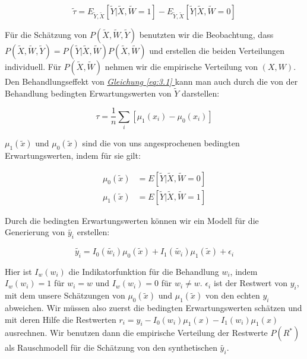 \documentclass[12pt,a4paper,twoside]{scrartcl}
\numberwithin{equation}{section}
\renewcommand*{\refeq}[1]{\emph{\hyperref[#1]{Gleichung \ref*{#1} }}}
\begin{document}
\begin{equation}\label{eq:3.1}
  \tilde{\tau} = E_{\widetilde{Y},\widetilde{X}}[\widetilde{Y}|\widetilde{X},\widetilde{W} = 1] - E_{\widetilde{Y},\widetilde{X}}[\widetilde{Y}|\widetilde{X},\widetilde{W} = 0]
\end{equation} 

\noindent
Für die Schätzung von $P(\widetilde{X},\widetilde{W},\widetilde{Y})$ benutzten wir die Beobachtung, dass $P(\widetilde{X},\widetilde{W},\widetilde{Y}) = P(\widetilde{Y}|\widetilde{X},\widetilde{W})P(\widetilde{X},\widetilde{W})$ und erstellen die beiden Verteilungen individuell. Für $P(\widetilde{X},\widetilde{W})$ nehmen wir die empirische Verteilung von $(X,W)$. Den Behandlungseffekt von \refeq{eq:3.1} kann man auch durch die von der Behandlung bedingten Erwartungswerten von $\widetilde{Y}$ darstellen\cite{schuler2017synth}:\par 

\begin{equation}\label{eq:3.2}
 \tau = \frac{1}{n}\sum_i[\mu_1(x_i)-\mu_0(x_i)]
\end{equation}

\noindent
$\mu_1(\tilde{x})$ und $\mu_0(\tilde{x})$ sind die von uns angesprochenen bedingten Erwartungswerten, indem für sie gilt:

\begin{equation}\label{eq:3.3}
\begin{split}
\mu_0(\tilde{x}) &= E[\widetilde{Y}|\widetilde{X},\widetilde{W} = 0]\\
\mu_1(\tilde{x}) &= E[\widetilde{Y}|\widetilde{X},\widetilde{W} = 1]
\end{split}
\end{equation}

\noindent
Durch die bedingten Erwartungswerten können wir ein Modell für die Generierung von $\tilde{y_i}$ erstellen:\par

\begin{equation}\label{eq:3.4}
 \tilde{y_i} = I_0(\tilde{w_i})\mu_0(\tilde{x}) + I_1(\tilde{w_i})\mu_1(\tilde{x}) + \epsilon_i
\end{equation}

\noindent
Hier ist $I_w(w_i)$ die Indikatorfunktion für die Behandlung $w_i$, indem $I_w(w_i) = 1$ für $w_i = w$ und $I_w(w_i) = 0$ für $w_i \neq w$. $\epsilon_i$ ist der Restwert von $y_i$, mit dem unsere Schätzungen von $\mu_0(\tilde{x})$ und $\mu_1(\tilde{x})$ von den echten $y_i$ abweichen. Wir müssen also zuerst die bedingten Erwartungswerten schätzen und mit deren Hilfe die Restwerten $r_i = y_i - I_0(w_i)\mu_1(x) - I_1(w_i)\mu_1(x)$ ausrechnen. Wir benutzen dann die empirische Verteilung der Restwerte $P(R^*)$ als Rauschmodell für die Schätzung von den synthetischen $\tilde{y_i}$\cite{schuler2017synth}.\par 
\end{document}
